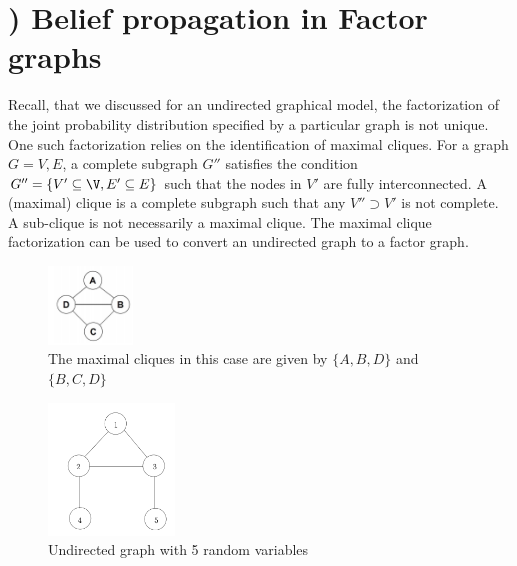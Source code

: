 \documentclass[11pt]{article}
\newcounter{QuestionCounter}
\newcounter{SubQuestionCounter}[QuestionCounter]
\newcommand{\newquestion}{\stepcounter{QuestionCounter}\setcounter{SubQuestionCounter}{1}\newpage}
\begin{document}
\newquestion
\section*{) Belief propagation in Factor graphs}
Recall, that we discussed for an undirected graphical model, the factorization of the joint probability distribution specified by a particular graph is not unique. One such factorization relies on the identification of maximal cliques. For a graph $G = {V, E}$, a complete subgraph $G''$ satisfies the condition $G'' = \{V' \subseteq \V, E' \subseteq E\}$ such that the nodes in $V'$ are fully interconnected. A (maximal) clique is a complete subgraph such that any $V'' \supset V'$ is not complete. A sub-clique is not necessarily a maximal clique. The maximal clique factorization can be used to convert an undirected graph to a factor graph. \newline
\begin{figure}[h]
    \centering
    \includegraphics[width=0.2\textwidth]{maximal_cliques.png}
    \caption{The maximal cliques in this case are given by $\{A, B, D\}$ and $\{ B, C, D\}$}
    \label{Fig 3}
\end{figure}
    \begin{figure}[h]
    \centering
    \includegraphics[width=0.3\textwidth]{undirected_graph.png}
    \caption{Undirected graph with 5 random variables}
    \label{Fig 4}
\end{figure}
\end{document}

